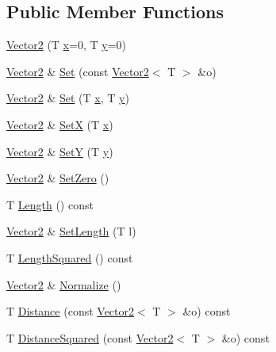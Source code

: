 \subsection*{Public Member Functions}
\begin{DoxyCompactItemize}
\item 
\hyperlink{classastu_1_1Vector2_a021ec0e80fa7ca80921a17172e30fe29}{Vector2} (T \hyperlink{classastu_1_1Vector2_aa60c30b27742255fbe7053b07a7e76ba}{x}=0, T \hyperlink{classastu_1_1Vector2_a6718f5a7005c38830dbd31283a87f5c9}{y}=0)
\item 
\hyperlink{classastu_1_1Vector2}{Vector2} \& \hyperlink{classastu_1_1Vector2_a303494be2ce5f334571f6f284ad13e28}{Set} (const \hyperlink{classastu_1_1Vector2}{Vector2}$<$ T $>$ \&o)
\item 
\hyperlink{classastu_1_1Vector2}{Vector2} \& \hyperlink{classastu_1_1Vector2_a44e396e8e35cf3c4d1cc50de70b70220}{Set} (T \hyperlink{classastu_1_1Vector2_aa60c30b27742255fbe7053b07a7e76ba}{x}, T \hyperlink{classastu_1_1Vector2_a6718f5a7005c38830dbd31283a87f5c9}{y})
\item 
\hyperlink{classastu_1_1Vector2}{Vector2} \& \hyperlink{classastu_1_1Vector2_adf5c57f8b6f337a4aa6eb79c0506d074}{SetX} (T \hyperlink{classastu_1_1Vector2_aa60c30b27742255fbe7053b07a7e76ba}{x})
\item 
\hyperlink{classastu_1_1Vector2}{Vector2} \& \hyperlink{classastu_1_1Vector2_af454152e76948f63a433a6343b5abaef}{SetY} (T \hyperlink{classastu_1_1Vector2_a6718f5a7005c38830dbd31283a87f5c9}{y})
\item 
\hyperlink{classastu_1_1Vector2}{Vector2} \& \hyperlink{classastu_1_1Vector2_a70eb8d4b44d3f973c5065a0ed5f9c01c}{Set\+Zero} ()
\item 
T \hyperlink{classastu_1_1Vector2_ab195006315ba4e54f6e89e01727dbd08}{Length} () const
\item 
\hyperlink{classastu_1_1Vector2}{Vector2} \& \hyperlink{classastu_1_1Vector2_afeae7c216e2c0846f576a11563a6404c}{Set\+Length} (T l)
\item 
T \hyperlink{classastu_1_1Vector2_a42ff8efbc4747ec1042867e30e565311}{Length\+Squared} () const
\item 
\hyperlink{classastu_1_1Vector2}{Vector2} \& \hyperlink{classastu_1_1Vector2_aedecfe4d0a04bb6e3b6dd94caa16e911}{Normalize} ()
\item 
T \hyperlink{classastu_1_1Vector2_a504029e7043988ec1e697b1a1e2cfb78}{Distance} (const \hyperlink{classastu_1_1Vector2}{Vector2}$<$ T $>$ \&o) const
\item 
T \hyperlink{classastu_1_1Vector2_ac60cbccfefd62216f648c388c5025649}{Distance\+Squared} (const \hyperlink{classastu_1_1Vector2}{Vector2}$<$ T $>$ \&o) const

\end{DoxyCompactItemize}
